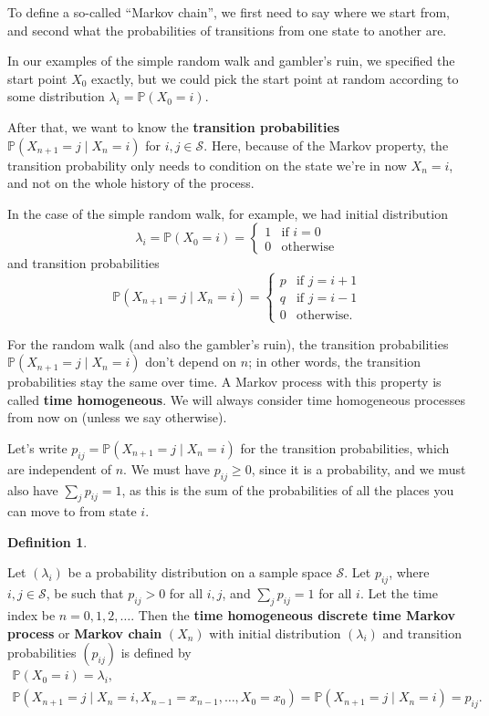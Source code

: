 \documentclass[
  a4paper,
]{article}
\theoremstyle{definition}
\newtheorem{definition}{Definition}[section]
\theoremstyle{definition}
\theoremstyle{definition}
\theoremstyle{remark}
\begin{document}
To define a so-called ``Markov chain'', we first need to say where we start from, and second what the probabilities of transitions from one state to another are.

In our examples of the simple random walk and gambler's ruin, we specified the start point \(X_0\) exactly, but we could pick the start point at random according to some distribution \(\lambda_i = \mathbb P(X_0 = i)\).

After that, we want to know the \textbf{transition probabilities} \(\mathbb P(X_{n+1} = j \mid X_n = i)\) for \(i,j \in \mathcal S\). Here, because of the Markov property, the transition probability only needs to condition on the state we're in now \(X_n = i\), and not on the whole history of the process.

In the case of the simple random walk, for example, we had initial distribution
\[ \lambda_i = \mathbb P(X_0 = i) = \begin{cases} 1 & \text{if $i = 0$} \\ 0 & \text{otherwise} \end{cases} \]
and transition probabilities
\[ \mathbb P(X_{n+1} = j \mid X_n = i) = \begin{cases} p & \text{if $j = i+1$} \\ q & \text{if $j = i-1$} \\ 0 & \text{otherwise.} \end{cases} \]

For the random walk (and also the gambler's ruin), the transition probabilities \(\mathbb P(X_{n+1} = j \mid X_n = i)\) don't depend on \(n\); in other words, the transition probabilities stay the same over time. A Markov process with this property is called \textbf{time homogeneous}. We will always consider time homogeneous processes from now on (unless we say otherwise).

Let's write \(p_{ij} = \mathbb P(X_{n+1} = j \mid X_n = i)\) for the transition probabilities, which are independent of \(n\).
We must have \(p_{ij} \geq 0\), since it is a probability, and we must also have \(\sum_j p_{ij} = 1\), as this is the sum of the probabilities of all the places you can move to from state \(i\).

\begin{definition}
\protect\hypertarget{def:def-thmc}{}\label{def:def-thmc}

Let \((\lambda_i)\) be a probability distribution on a sample space \(\mathcal S\). Let \(p_{ij}\), where \(i,j \in \mathcal S\), be such that \(p_{ij} > 0\) for all \(i,j\), and \(\sum_j p_{ij} = 1\) for all \(i\). Let the time index be \(n = 0,1,2,\dots\). Then the \textbf{time homogeneous discrete time Markov process} or \textbf{Markov chain} \((X_n)\) with initial distribution \((\lambda_i)\) and transition probabilities \((p_{ij})\) is defined by
\begin{gather*}
    \mathbb P(X_0 = i) = \lambda_i ,\\
    \mathbb P(X_{n+1} = j \mid X_n = i, X_{n-1} = x_{n-1}, \dots, X_0 = x_0) = \mathbb P(X_{n+1} = j \mid X_n = i) =  p_{ij}  . \end{gather*}

\end{definition}
\end{document}
